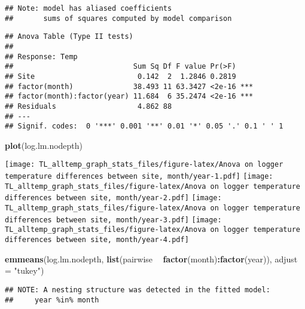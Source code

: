 \documentclass[
]{article}
\newenvironment{Shaded}{\begin{snugshade}}{\end{snugshade}}
\newcommand{\DataTypeTok}[1]{\textcolor[rgb]{0.13,0.29,0.53}{#1}}
\newcommand{\KeywordTok}[1]{\textcolor[rgb]{0.13,0.29,0.53}{\textbf{#1}}}
\newcommand{\NormalTok}[1]{#1}
\newcommand{\OperatorTok}[1]{\textcolor[rgb]{0.81,0.36,0.00}{\textbf{#1}}}
\newcommand{\StringTok}[1]{\textcolor[rgb]{0.31,0.60,0.02}{#1}}
\begin{document}
\begin{verbatim}
## Note: model has aliased coefficients
##       sums of squares computed by model comparison
\end{verbatim}

\begin{verbatim}
## Anova Table (Type II tests)
## 
## Response: Temp
##                            Sum Sq Df F value Pr(>F)    
## Site                        0.142  2  1.2846 0.2819    
## factor(month)              38.493 11 63.3427 <2e-16 ***
## factor(month):factor(year) 11.684  6 35.2474 <2e-16 ***
## Residuals                   4.862 88                   
## ---
## Signif. codes:  0 '***' 0.001 '**' 0.01 '*' 0.05 '.' 0.1 ' ' 1
\end{verbatim}

\begin{Shaded}
\begin{Highlighting}[]
\KeywordTok{plot}\NormalTok{(log.lm.nodepth)}
\end{Highlighting}
\end{Shaded}

\texttt{[image: TL\_alltemp\_graph\_stats\_files/figure-latex/Anova on logger temperature differences between site, month/year-1.pdf]}
\texttt{[image: TL\_alltemp\_graph\_stats\_files/figure-latex/Anova on logger temperature differences between site, month/year-2.pdf]}
\texttt{[image: TL\_alltemp\_graph\_stats\_files/figure-latex/Anova on logger temperature differences between site, month/year-3.pdf]}
\texttt{[image: TL\_alltemp\_graph\_stats\_files/figure-latex/Anova on logger temperature differences between site, month/year-4.pdf]}

\begin{Shaded}
\begin{Highlighting}[]
\KeywordTok{emmeans}\NormalTok{(log.lm.nodepth, }\KeywordTok{list}\NormalTok{(pairwise }\OperatorTok{~}\StringTok{ }\KeywordTok{factor}\NormalTok{(month)}\OperatorTok{:}\KeywordTok{factor}\NormalTok{(year)), }\DataTypeTok{adjust =} \StringTok{"tukey"}\NormalTok{)}
\end{Highlighting}
\end{Shaded}

\begin{verbatim}
## NOTE: A nesting structure was detected in the fitted model:
##     year %in% month
\end{verbatim}
\end{document}
